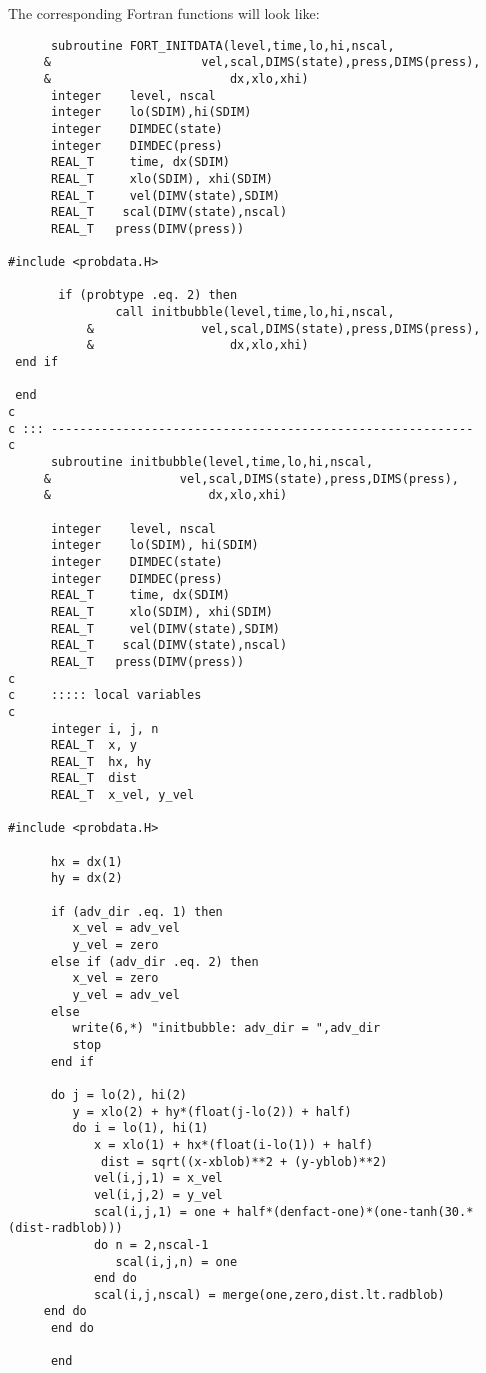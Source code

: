 The corresponding Fortran functions will look like:
\begin{lstlisting}
      subroutine FORT_INITDATA(level,time,lo,hi,nscal,
     &	 	               vel,scal,DIMS(state),press,DIMS(press),
     &                         dx,xlo,xhi)
      integer    level, nscal
      integer    lo(SDIM),hi(SDIM)
      integer    DIMDEC(state)
      integer    DIMDEC(press)
      REAL_T     time, dx(SDIM)
      REAL_T     xlo(SDIM), xhi(SDIM)
      REAL_T     vel(DIMV(state),SDIM)
      REAL_T    scal(DIMV(state),nscal)
      REAL_T   press(DIMV(press))

#include <probdata.H>

       if (probtype .eq. 2) then
               call initbubble(level,time,lo,hi,nscal,
           &     	       vel,scal,DIMS(state),press,DIMS(press),
           &                   dx,xlo,xhi)
 end if

 end
c
c ::: -----------------------------------------------------------
c
      subroutine initbubble(level,time,lo,hi,nscal,
     &	 	            vel,scal,DIMS(state),press,DIMS(press),
     &                      dx,xlo,xhi)

      integer    level, nscal
      integer    lo(SDIM), hi(SDIM)
      integer    DIMDEC(state)
      integer    DIMDEC(press)
      REAL_T     time, dx(SDIM)
      REAL_T     xlo(SDIM), xhi(SDIM)
      REAL_T     vel(DIMV(state),SDIM)
      REAL_T    scal(DIMV(state),nscal)
      REAL_T   press(DIMV(press))
c
c     ::::: local variables
c
      integer i, j, n
      REAL_T  x, y
      REAL_T  hx, hy
      REAL_T  dist
      REAL_T  x_vel, y_vel

#include <probdata.H>

      hx = dx(1)
      hy = dx(2)

      if (adv_dir .eq. 1) then
         x_vel = adv_vel
         y_vel = zero
      else if (adv_dir .eq. 2) then
         x_vel = zero
         y_vel = adv_vel
      else 
         write(6,*) "initbubble: adv_dir = ",adv_dir
         stop
      end if

      do j = lo(2), hi(2)
         y = xlo(2) + hy*(float(j-lo(2)) + half)
         do i = lo(1), hi(1)
            x = xlo(1) + hx*(float(i-lo(1)) + half)
             dist = sqrt((x-xblob)**2 + (y-yblob)**2)
            vel(i,j,1) = x_vel
            vel(i,j,2) = y_vel
            scal(i,j,1) = one + half*(denfact-one)*(one-tanh(30.*(dist-radblob)))
            do n = 2,nscal-1
               scal(i,j,n) = one
            end do                  
            scal(i,j,nscal) = merge(one,zero,dist.lt.radblob)
	 end do
      end do

      end
\end{lstlisting}

